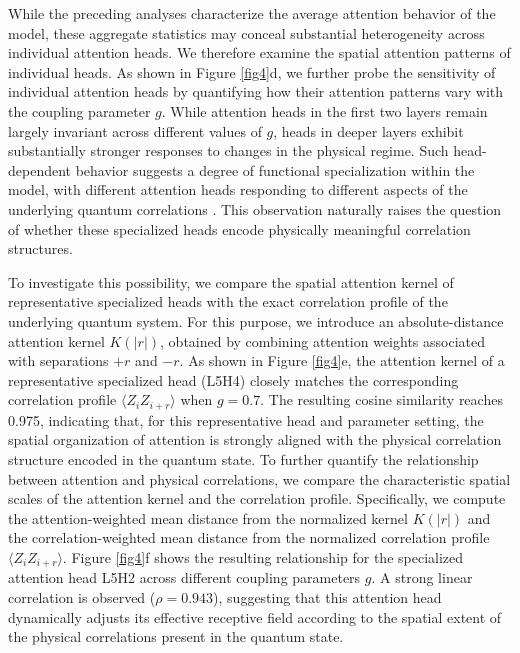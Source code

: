 \documentclass[pdflatex,sn-mathphys-num]{sn-jnl}%
\theoremstyle{thmstyleone}%
\theoremstyle{thmstyletwo}%
\theoremstyle{thmstylethree}%
\begin{document}
While the preceding analyses characterize the average attention behavior of the model, these aggregate statistics may conceal substantial heterogeneity across individual attention heads. We therefore examine the spatial attention patterns of individual heads. As shown in Figure \ref{fig4}d, we further probe the sensitivity of individual attention heads by quantifying how their attention patterns vary with the coupling parameter $g$. While attention heads in the first two layers remain largely invariant across different values of $g$, heads in deeper layers exhibit substantially stronger responses to changes in the physical regime. Such head-dependent behavior suggests a degree of functional specialization within the model, with different attention heads responding to different aspects of the underlying quantum correlations \cite{voita2019analyzing, michel2019sixteen}. This observation naturally raises the question of whether these specialized heads encode physically meaningful correlation structures. 

To investigate this possibility, we compare the spatial attention kernel of representative specialized heads with the exact correlation profile of the underlying quantum system. For this purpose, we introduce an absolute-distance attention kernel $K(\lvert r \rvert)$, obtained by combining attention weights associated with separations $+r$ and $-r$. As shown in Figure \ref{fig4}e, the attention kernel of a representative specialized head (L5H4) closely matches the corresponding correlation profile $\langle Z_i Z_{i+r}\rangle$ when $g=0.7$. The resulting cosine similarity reaches 0.975, indicating that, for this representative head and parameter setting, the spatial organization of attention is strongly aligned with the physical correlation structure encoded in the quantum state.
To further quantify the relationship between attention and physical correlations, we compare the characteristic spatial scales of the attention kernel and the correlation profile. Specifically, we compute the attention-weighted mean distance from the normalized kernel $K(\lvert r \rvert)$ and the correlation-weighted mean distance from the normalized correlation profile $\langle Z_i Z_{i+r}\rangle$. Figure \ref{fig4}f shows the resulting relationship for the specialized attention head L5H2 across different coupling parameters $g$. A strong linear correlation is observed ($\rho = 0.943$), suggesting that this attention head dynamically adjusts its effective receptive field according to the spatial extent of the physical correlations present in the quantum state.
\end{document}
